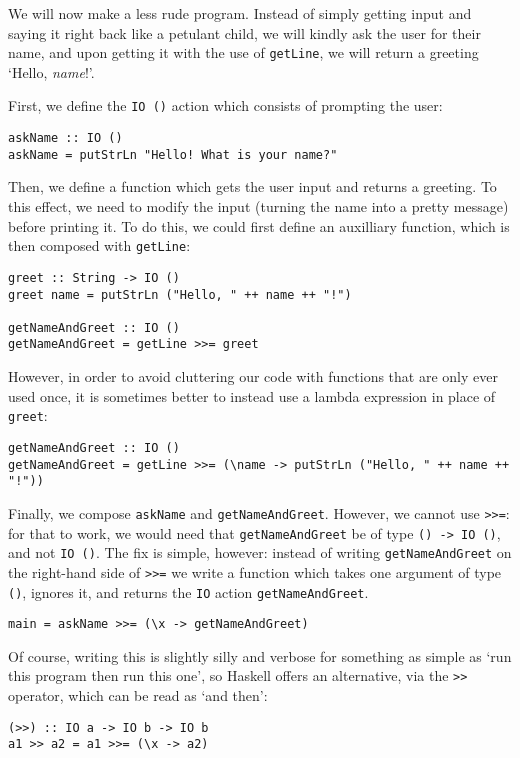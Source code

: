 \documentclass[11pt]{article}
\theoremstyle{nonumberplain}
\newcommand*\lsin{\lstinline}
\begin{document}
We will now make a less rude program. Instead of simply getting input and saying it right back like a petulant child, we will kindly ask the user for their name, and upon getting it with the use of \lsin|getLine|, we will return a greeting `Hello, \textit{name}!'.

First, we define the \lsin|IO ()| action which consists of prompting the user:
\begin{lstlisting}
askName :: IO ()
askName = putStrLn "Hello! What is your name?"
\end{lstlisting}

Then, we define a function which gets the user input and returns a greeting. To this effect, we need to modify the input (turning the name into a pretty message) before printing it. To do this, we could first define an auxilliary function, which is then composed with \lsin|getLine|:
\begin{lstlisting}
greet :: String -> IO ()
greet name = putStrLn ("Hello, " ++ name ++ "!")

getNameAndGreet :: IO ()
getNameAndGreet = getLine >>= greet
\end{lstlisting}

However, in order to avoid cluttering our code with functions that are only ever used once, it is sometimes better to instead use a lambda expression in place of \lsin|greet|:
\begin{lstlisting}
getNameAndGreet :: IO ()
getNameAndGreet = getLine >>= (\name -> putStrLn ("Hello, " ++ name ++ "!"))
\end{lstlisting}

Finally, we compose \lsin|askName| and \lsin|getNameAndGreet|. However, we cannot use \lsin|>>=|: for that to work, we would need that \lsin|getNameAndGreet| be of type \lsin|() -> IO ()|, and not \lsin|IO ()|. The fix is simple, however: instead of writing \lsin|getNameAndGreet| on the right-hand side of \lsin|>>=| we write a function which takes one argument of type \lsin|()|, ignores it, and returns the \lsin|IO| action \lsin|getNameAndGreet|.
\begin{lstlisting}
main = askName >>= (\x -> getNameAndGreet)
\end{lstlisting}

Of course, writing this is slightly silly and verbose for something as simple as `run this program then run this one', so Haskell offers an alternative, via the \lsin|>>| operator, which can be read as `and then':
\begin{lstlisting}
(>>) :: IO a -> IO b -> IO b
a1 >> a2 = a1 >>= (\x -> a2)
\end{lstlisting}
\end{document}
